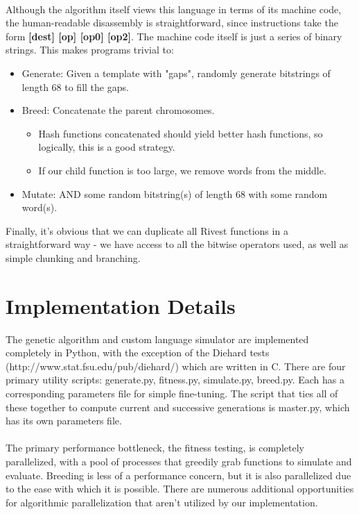 \documentclass{article}
\begin{document}
\paragraph{}
Although the algorithm itself views this language in terms of its machine code, the human-readable disassembly is straightforward, since instructions take the form \textbf{[dest] [op] [op0] [op2]}. The machine code itself is just a series of binary strings. This makes programs trivial to:
	\begin{itemize}
	\item Generate: Given a template with "gaps", randomly generate bitstrings of length 68 to fill the gaps.
	\item Breed: Concatenate the parent chromosomes.
		\begin{itemize}
			\item Hash functions concatenated should yield better hash functions, so logically, this is a good strategy.
			\item If our child function is too large, we remove words from the middle.
		\end{itemize}
	\item Mutate: AND some random bitstring(s) of length 68 with some random word(s).
	\end{itemize}

Finally, it's obvious that we can duplicate all Rivest functions in a straightforward way - we have access to all the bitwise operators used, as well as simple chunking and branching.

\section{Implementation Details}
The genetic algorithm and custom language simulator are implemented completely in Python, with the exception of the Diehard tests (http://www.stat.fsu.edu/pub/diehard/) which are written in C. There are four primary utility scripts: generate.py, fitness.py, simulate.py, breed.py. Each has a corresponding parameters file for simple fine-tuning. The script that ties all of these together to compute current and successive generations is master.py, which has its own parameters file.

\paragraph{}
The primary performance bottleneck, the fitness testing, is completely parallelized, with a pool of processes that greedily grab functions to simulate and evaluate. Breeding is less of a performance concern, but it is also parallelized due to the ease with which it is possible. There are numerous additional opportunities for algorithmic parallelization that aren't utilized by our implementation.
\end{document}
